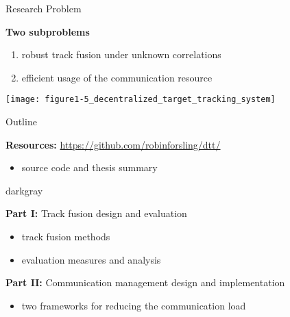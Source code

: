 \documentclass[aspectratio=1610]{beamer}
\begin{document}
\begin{frame}{Research Problem}

\textbf{Two subproblems}
\begin{enumerate}
    \item robust \alert{track fusion} under unknown correlations
    \item efficient usage of the  \alert{communication resource}
\end{enumerate}

\vspace{1em}

\begin{center}
    \texttt{[image: figure1-5\_decentralized\_target\_tracking\_system]}
\end{center}

\end{frame}


\begin{frame}{Outline}

\begin{small}

\textbf{Resources:} \alert{\url{https://github.com/robinforsling/dtt/}}
\begin{itemize}
    \item \matlab source code and thesis summary
\end{itemize}

\vspace{0.5em}

\begin{rfshadedcolorbox}[title={Outline}]{darkgray}

\textbf{Part I:} Track fusion design and evaluation
\begin{itemize}
    \item track fusion methods
    \item evaluation measures and analysis
\end{itemize}

\textbf{Part II:} Communication management design and implementation
\begin{itemize}
    \item two frameworks for reducing the communication load
\end{itemize}

\end{rfshadedcolorbox}
\end{small}

\end{frame}
\end{document}
